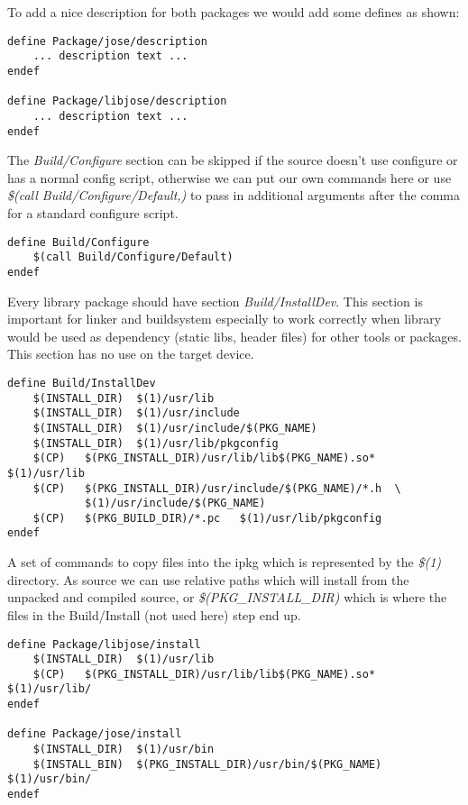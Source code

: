 To add a nice description for both packages we would add some defines as shown:
\begin{lstlisting}[columns=fixed,basicstyle=\ttfamily\footnotesize,tabsize=4,backgroundcolor=\color{yellow!10}]
define Package/jose/description
	... description text ...
endef

define Package/libjose/description
	... description text ...
endef
\end{lstlisting}
The {\it Build/Configure} section can be skipped if the source doesn't use configure or has a normal config script, otherwise we can put our own commands here or use {\it \$(call Build/Configure/Default,)} to pass in additional arguments after the comma for a standard configure script.
\begin{lstlisting}[columns=fixed,basicstyle=\ttfamily\footnotesize,tabsize=4,backgroundcolor=\color{yellow!10}]
define Build/Configure
	$(call Build/Configure/Default)
endef
\end{lstlisting}
Every library package should have section {\it Build/InstallDev}.
This section is important for linker and buildsystem especially to work correctly when library would be used as dependency (static libs, header files) for other tools or packages.
This section has no use on the target device.
\begin{lstlisting}[columns=fixed,basicstyle=\ttfamily\footnotesize,tabsize=4,backgroundcolor=\color{yellow!10}]
define Build/InstallDev
	$(INSTALL_DIR)	$(1)/usr/lib
	$(INSTALL_DIR)  $(1)/usr/include
	$(INSTALL_DIR)	$(1)/usr/include/$(PKG_NAME)
	$(INSTALL_DIR)	$(1)/usr/lib/pkgconfig
	$(CP)	$(PKG_INSTALL_DIR)/usr/lib/lib$(PKG_NAME).so*	$(1)/usr/lib
	$(CP)	$(PKG_INSTALL_DIR)/usr/include/$(PKG_NAME)/*.h	\
			$(1)/usr/include/$(PKG_NAME)
	$(CP)	$(PKG_BUILD_DIR)/*.pc	$(1)/usr/lib/pkgconfig
endef
\end{lstlisting}
A set of commands to copy files into the ipkg which is represented by the {\it \$(1)} directory.
As source we can use relative paths which will install from the unpacked and compiled source, or {\it \$(PKG\_INSTALL\_DIR)} which is where the files in the Build/Install (not used here) step end up.
\begin{lstlisting}[columns=fixed,basicstyle=\ttfamily\footnotesize,tabsize=4,backgroundcolor=\color{yellow!10}]
define Package/libjose/install
	$(INSTALL_DIR)	$(1)/usr/lib
	$(CP)	$(PKG_INSTALL_DIR)/usr/lib/lib$(PKG_NAME).so*	$(1)/usr/lib/
endef

define Package/jose/install
	$(INSTALL_DIR)	$(1)/usr/bin
	$(INSTALL_BIN)	$(PKG_INSTALL_DIR)/usr/bin/$(PKG_NAME)	$(1)/usr/bin/
endef
\end{lstlisting}
